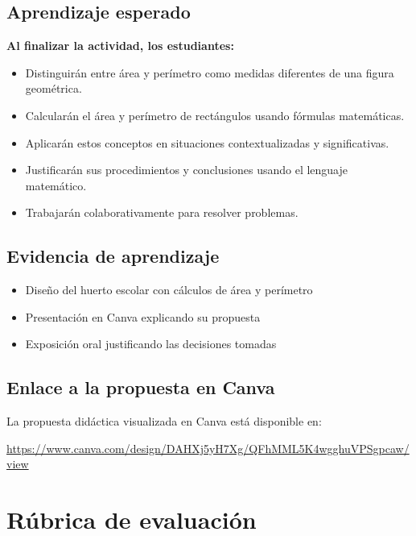 \documentclass[spanish,letterpaper,oneside]{article}
\begin{document}
\begin{propuestabox}
\subsection{Aprendizaje esperado}

\textbf{Al finalizar la actividad, los estudiantes:}

\begin{itemize}
  \item Distinguirán entre área y perímetro como medidas diferentes de una figura geométrica.
  \item Calcularán el área y perímetro de rectángulos usando fórmulas matemáticas.
  \item Aplicarán estos conceptos en situaciones contextualizadas y significativas.
  \item Justificarán sus procedimientos y conclusiones usando el lenguaje matemático.
  \item Trabajarán colaborativamente para resolver problemas.
\end{itemize}

\subsection{Evidencia de aprendizaje}

\begin{itemize}
  \item Diseño del huerto escolar con cálculos de área y perímetro
  \item Presentación en Canva explicando su propuesta
  \item Exposición oral justificando las decisiones tomadas
\end{itemize}

\subsection{Enlace a la propuesta en Canva}

La propuesta didáctica visualizada en Canva está disponible en:
\begin{center}
  \url{https://www.canva.com/design/DAHXj5yH7Xg/QFhMML5K4wgghuVPSgpcaw/view}
\end{center}

\end{propuestabox}

\section{Rúbrica de evaluación}
\end{document}
